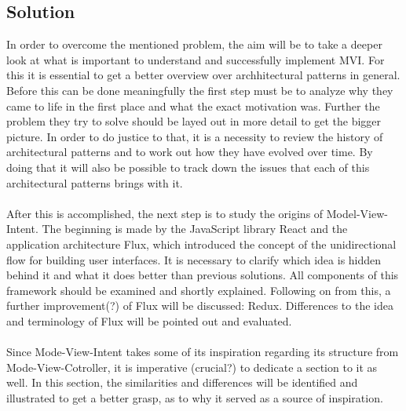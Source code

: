 \subsection{Solution}
\label{subsec:solution}



\newpage
In order to overcome the mentioned problem, the aim will be to take a deeper look at what is important to understand and successfully implement MVI.
For this it is essential to get a better overview over archhitectural patterns in general. Before this can be done meaningfully the first step must be 
to analyze why they came to life in the first place and what the exact motivation was. Further the problem they try to solve should be layed out in more detail to 
get the bigger picture. In order to do justice to that, it is a necessity to review the history of architectural patterns and to work out how they have evolved over time.
By doing that it will also be possible to track down the issues that each of this architectural patterns brings with it.
\\
\\
After this is accomplished, the next step is to study the origins of Model-View-Intent. The beginning is made by the JavaScript library React and the application architecture
Flux, which introduced the concept of the unidirectional flow for building user interfaces. It is necessary to clarify which idea is hidden behind it and what it does
better than previous solutions. All components of this framework should be examined and shortly explained. Following on from this, a further improvement(?) of Flux will 
be discussed: Redux. Differences to the idea and terminology of Flux will be pointed out and evaluated.
\\
\\
Since Mode-View-Intent takes some of its inspiration regarding its structure from Mode-View-Cotroller, it is imperative (crucial?) to dedicate a section to it as well.
In this section, the similarities and differences will be identified and illustrated to get a better grasp, as to why it served as a source of inspiration.